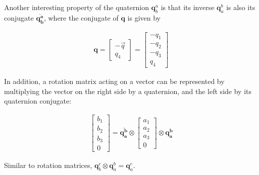 \documentclass{article}
\begin{document}
\noindent Another interesting property of the quaternion $\mathbf{q}^a_{b}$ is that its inverse $\mathbf{q}^b_{a}$ is also its conjugate $\overline{\mathbf{{q}^a_{b}}}$, where the conjugate of $\mathbf{q}$ is given by 

\begin{align}
    \mathbf{q} = \begin{bmatrix}
    -\Vec{q} \\
    q_{4}
\end{bmatrix} = \begin{bmatrix}
    -q_{1} \\
    -q_{2} \\
    -q_{3} \\
    q_{4}
\end{bmatrix} \tag{3.14}
\end{align}

\noindent In addition, a rotation matrix acting on a vector can be represented by multiplying the vector on the right side by a quaternion, and the left side by its quaternion conjugate:

\begin{align}
    \begin{bmatrix}
        b_{1} \\
        b_{2} \\
        b_{3} \\
        0
    \end{bmatrix} = \overline{\mathbf{{q}^b_{a}}} \otimes \begin{bmatrix}
        a_{1} \\
        a_{2} \\
        a_{3} \\
        0
    \end{bmatrix} \otimes \mathbf{{q}^b_{a}} \tag{3.15}
\end{align}

\noindent Similar to rotation matrices, $\mathbf{q}^c_{b} \otimes \mathbf{q}^b_{a} = \mathbf{q}^c_{a}$. 

\subsection{\color{black}{Rotational Kinematics and Dynamics}}

\subsubsection{\color{black}{Angular Velocity and Momentum}}
\end{document}
